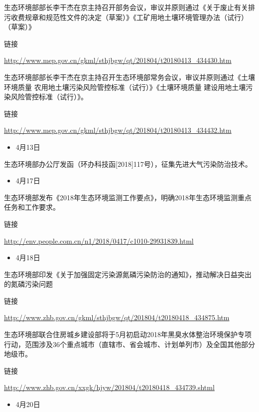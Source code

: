 \documentclass[
]{book}
\providecommand{\tightlist}{%
  \setlength{\itemsep}{0pt}\setlength{\parskip}{0pt}}
\begin{document}
生态环境部部长李干杰在京主持召开部务会议，审议并原则通过《关于废止有关排污收费规章和规范性文件的决定（草案）》《工矿用地土壤环境管理办法（试行）（草案）》

链接

\url{http://www.mep.gov.cn/gkml/sthjbgw/qt/201804/t20180413_434430.htm}

生态环境部部长李干杰在京主持召开生态环境部常务会议，审议并原则通过《土壤环境质量 农用地土壤污染风险管控标准（试行）》《土壤环境质量 建设用地土壤污染风险管控标准（试行）》。

链接

\url{http://www.mep.gov.cn/gkml/sthjbgw/qt/201804/t20180413_434432.htm}

\begin{itemize}
\tightlist
\item
  4月13日
\end{itemize}

生态环境部办公厅发函（环办科技函{[}2018{]}117号），征集先进大气污染防治技术。

\begin{itemize}
\tightlist
\item
  4月17日
\end{itemize}

生态环境部发布《2018年生态环境监测工作要点》，明确2018年生态环境监测重点任务和工作要求。

链接

\url{http://env.people.com.cn/n1/2018/0417/c1010-29931839.html}

\begin{itemize}
\tightlist
\item
  4月18日
\end{itemize}

生态环境部印发《关于加强固定污染源氮磷污染防治的通知》，推动解决日益突出的氮磷污染问题

链接

\url{http://www.zhb.gov.cn/gkml/sthjbgw/qt/201804/t20180418_434875.htm}

生态环境部联合住房城乡建设部将于5月初启动2018年黑臭水体整治环境保护专项行动，范围涉及36个重点城市（直辖市、省会城市、计划单列市）及全国其他部分地级市。

链接

\url{http://www.zhb.gov.cn/xxgk/hjyw/201804/t20180418_434739.shtml}

\begin{itemize}
\tightlist
\item
  4月20日
\end{itemize}
\end{document}
